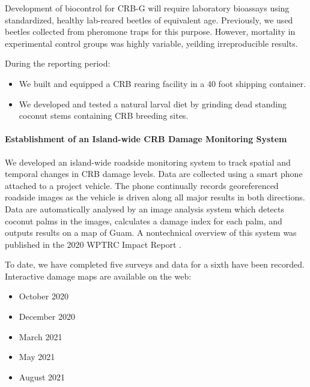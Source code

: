 \begin{refsection}
Development of biocontrol for CRB-G will require laboratory bioassays using standardized, healthy lab-reared beetles of equivalent age. Previously, we used beetles collected from pheromone traps for this purpose. However, mortality in experimental control groups was highly variable, yeilding irreproducible results. 

During the reporting period:
\begin{itemize}
	\item We built and equipped a CRB rearing facility in a 40 foot shipping container.  
	\item We developed and tested a natural larval diet by grinding dead standing coconut stems containing CRB breeding sites.
\end{itemize}

\paragraph{Establishment of an Island-wide CRB Damage Monitoring System}

We developed an island-wide roadside monitoring system to track spatial and temporal changes in CRB damage levels. Data are collected using a smart phone attached to a project vehicle. The phone continually records georeferenced roadside images as the vehicle is driven along all major results in both directions. Data are automatically analysed by an image analysis system which detects coconut palms in the images, calculates a damage index for each palm, and outputs results on a map of Guam. A nontechnical overview of this system was published in the 2020 WPTRC Impact Report \parencite{moore_using_2020-1}.

To date, we have completed five surveys and data for a sixth have been recorded. Interactive damage maps are available on the web: 
\begin{itemize}
	\item October 2020  \parencite{moore_crb_2020-1}
	\item December 2020 \parencite{moore_crb_2020}
	\item March 2021 \parencite{moore_crb_2021} 
	\item May 2021 \parencite{moore_crb_2021-1}
	\item August 2021 \parencite{moore_crb_2021-2}	
\end{itemize}


%
%


\end{refsection}
